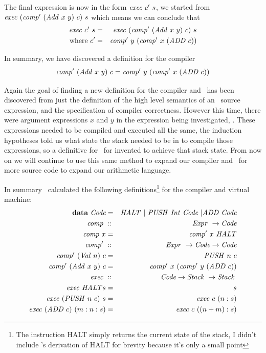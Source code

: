 \documentclass {article}
\begin{document}
The final expression is now in the form
\( \mathit{exec\ } c'\ s \), we started from
\( \mathit{exec\ } (\mathit{comp'\ }  (\mathit{Add\ } x\ y)\ c)\ s \)
which means we can conclude that 
\begin{eqnarray*}
\mathit{exec\ } c'\ s &=& \mathit{exec\ } (\mathit{comp'\ }  (\mathit{Add\ } x\ y)\ c)\ s \\
\mbox{where}\ c' &=& \mathit{comp'\ } y\ (\mathit{comp'\ } x\ (\mathit{ADD\ } c))
\end{eqnarray*}

In summary, we have discovered a definition for the
compiler
\begin{equation*}
\mathit{comp'\ }  (\mathit{Add\ } x\ y)\ c
= \mathit{comp'\ } y\ (\mathit{comp'\ } x\ (\mathit{ADD\ } c))
\end{equation*}

Again the goal of finding a new definition for the
compiler and \vm\ has been discovered from just
the definition of the high level semantics 
of an \add\ source expression, and the specification 
of compiler correctness.
However this time, there were argument expressions
$x$ and $y$ in the expression being investigated, \add.
These expressions needed to be compiled and executed
all the same, the
induction hypotheses told us what state the stack needed
to be in to compile those expressions,
so a definitive for \exec\ for invented to achieve that stack state.
From now on we will continue to use this same method to
expand our compiler and \vm\ for more 
source code to expand our arithmetic language.

\newcommand{\HALTt}{\textit{HALT}}
\newcommand{\Stack}{\textit{Stack\ }}
\newcommand{\HALT}{\mathit{HALT}}

In summary \BH\ calculated the following definitions\footnote{
The instruction HALT simply returns the current state of the stack,
I didn't include \BH's derivation of HALT for brevity because
it's only a small point}
for the compiler and virtual machine:
\begin{eqnarray}
	\textbf{data}\  \code &=& \HALT\ |\ 
			 \PUSH \Int \code\ | \ADD \code \nonumber \\
	\Comp &::& \Expr \rightarrow \code \nonumber \\
	\Comp x &=& \Compp  x\ \HALT \label{comp}\\
	\Compp &::& \Expr \rightarrow \code \rightarrow \code \nonumber \\
	\Compp  (\Val n)\ c &=& \PUSH n\ c \label{compval} \\
	\Compp  (\Add x\ y)\ c 
				&=& \Compp  x\ (\Compp  y\ (\ADD c)) \label{compadd}\\
	\Exec &::& \code  \rightarrow \Stack \rightarrow \Stack \nonumber \\
	\Exec \HALT s &=& s \label{exechalt}\\
	\Exec (\PUSH n\ c)\ s &=& \Exec c\ (n:s) \label{execpush}\\
	\Exec (\ADD c)\ (m:n:s) &=& \Exec c\ ((n + m):s) \label{execadd}
\end{eqnarray}
\end{document}
